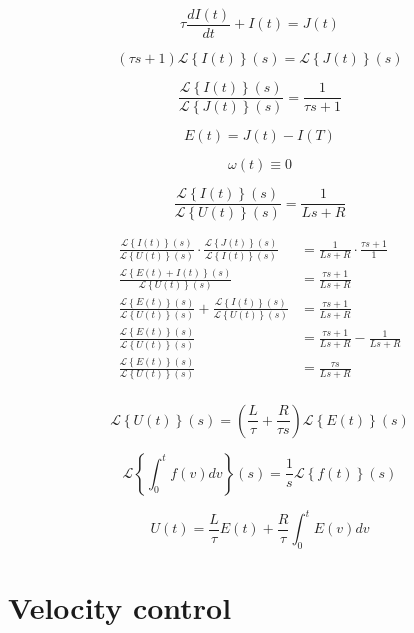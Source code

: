 \documentclass{article}
\newcommand{\Laplace}[1]{\mathcal{L}\left\{#1\right\}(s)}
\begin{document}
$$
\tau \frac{dI(t)}{dt} + I(t) = J(t)
$$

$$
(\tau s + 1)\Laplace{I(t)}  = \Laplace{J(t)}
$$

\begin{equation}
\frac{\Laplace{I(t)}}{\Laplace{J(t)}} = \frac{1}{\tau s + 1}
\label{eq:currentloop}
\end{equation}

$$
E(t) = J(t) - I(T)
$$

$$
\omega(t) \equiv 0
$$

$$
\frac{\Laplace{I(t)}}{\Laplace{U(t)}} = \frac{1}{Ls+R}
$$

\begin{align*}
    \frac{\Laplace{I(t)}}{\Laplace{U(t)}} \cdot \frac{\Laplace{J(t)}}{\Laplace{I(t)}} & = \frac{1}{Ls+R}  \cdot \frac{\tau s + 1}{1}\\
    \frac{\Laplace{E(t) + I(t)}}{\Laplace{U(t)}}  & = \frac{\tau s+1}{Ls+R}\\
    \frac{\Laplace{E(t)}}{\Laplace{U(t)}} + \frac{\Laplace{I(t)}}{\Laplace{U(t)}}  & = \frac{\tau s+1}{Ls+R}\\
    \frac{\Laplace{E(t)}}{\Laplace{U(t)}}   & = \frac{\tau s+1}{Ls+R} - \frac{1}{Ls+R}\\
    \frac{\Laplace{E(t)}}{\Laplace{U(t)}}   & = \frac{\tau s}{Ls+R}\\
\end{align*}

$$
\Laplace{U(t)} = \left(\frac{L}{\tau} + \frac{R}{\tau s}\right)\Laplace{E(t)}
$$

$$
\Laplace{\int_0^tf(v)dv} = \frac{1}{s}\Laplace{f(t)}
$$

$$
U(t) = \frac{L}{\tau}E(t) + \frac{R}{\tau}\int_0^t E(v) dv
$$

\section{Velocity control}
\end{document}
